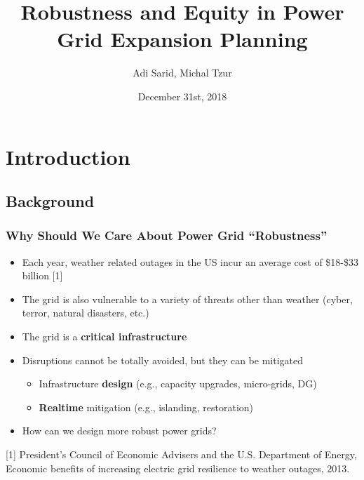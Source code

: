 \documentclass{beamer}
\title[Robustness and Equity in Power Grid Planning]{Robustness and Equity in Power Grid Expansion Planning}
\author[Sarid, Tzur]{Adi Sarid, Michal Tzur}
\institute[Tel-Aviv University]{\normalsize Department of Industrial Engineering, Tel-Aviv University, Israel}
\date{December 31st, 2018}
\begin{document}
\begin{frame}
  \titlepage
\end{frame}


\section{Introduction}
\subsection{Background}
\begin{frame}
\frametitle{Why Should We Care About Power Grid ``Robustness''}
\begin{itemize}
	\item Each year, weather related outages in the US incur an average cost of \$18-\$33 billion [1]
	\item The grid is also vulnerable to a variety of threats other than weather (cyber, terror, natural disasters, etc.)
	\item The grid is a \textbf{critical infrastructure}
	\item Disruptions cannot be totally avoided, but they can be mitigated
	\begin{itemize}
		\item Infrastructure \textbf{design} (e.g., capacity upgrades, micro-grids, DG)
		\item \textbf{Realtime} mitigation (e.g., islanding, restoration)
	\end{itemize}
  \item How can we design more robust power grids?
\end{itemize}
\vspace{0.2in}
\tiny [1] President's Council of Economic Advisers and the U.S. Department of Energy, Economic benefits of increasing electric grid resilience to weather outages, 2013.
\end{frame}
\end{document}
